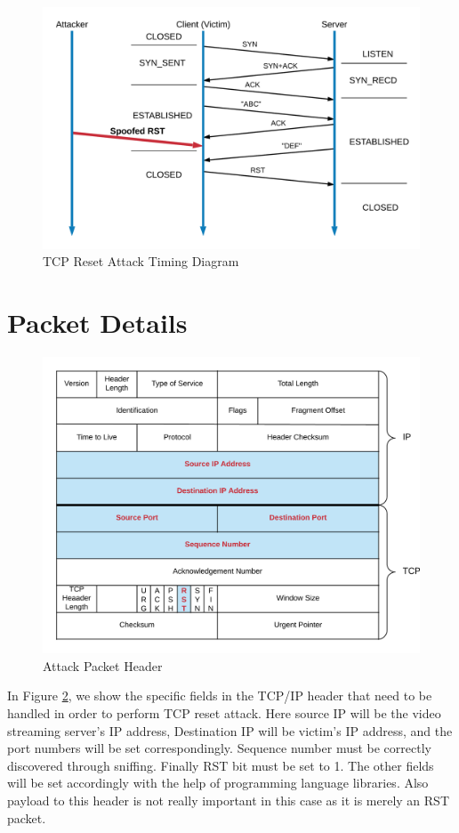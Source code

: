 \documentclass[14pt]{extarticle}
\begin{document}
    \begin{figure}
    	\centering
    	\includegraphics[width=.95\textwidth]{Pictures/Design/TCP_RST_Timing_Diagram.png}
    	\caption{TCP Reset Attack Timing Diagram} 
    	\label{fig:RST_Attack_Tim}
    \end{figure}
    
\section{Packet Details}
    \begin{figure}[!h]
    	\centering
    	\includegraphics[width=.85\textwidth]{Pictures/Design/TCP_IP_Packet.png}
    	\caption{Attack Packet Header} 
    	\label{fig:Attack_Packet}
    \end{figure}

    In Figure \ref{fig:Attack_Packet}, we show the specific fields in the TCP/IP header that need to be handled in order to perform TCP reset attack. Here source IP will be the video streaming server's IP address, Destination IP will be victim's IP address, and the port numbers will be set correspondingly. Sequence number must be correctly discovered through sniffing. Finally RST bit must be set to 1. The other fields will be set accordingly with the help of programming language libraries. Also payload to this header is not really important in this case as it is merely an RST packet.
\end{document}
